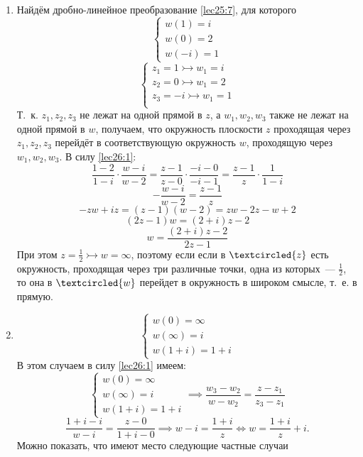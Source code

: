 \documentclass[../../main.tex]{subfiles}
\begin{document}
\begin{examples}
\;

 \begin{enumerate}
  \item
 Найдём дробно-линейное преобразование \eqref{lec25:7}, 
 для которого
 \[
 \begin{cases}
w(1) = i \\ 
w(0) = 2 \\
w(-i) = 1  
 \end{cases}
\]
 \[\begin{cases}
  z_1 = 1 \rightarrowtail w_1 = i \\
  z_2 = 0 \rightarrowtail w_1 = 2 \\
  z_3 = -i \rightarrowtail w_1 = 1 \\
  \end{cases}
 \]
 Т.~к. $z_1, z_2, z_3$ не лежат на одной прямой в \textcircled{$z$}, 
 а $w_1, w_2, w_3$ также не лежат на одной прямой в \textcircled{$w$}, 
 получаем, что окружность плоскости \textcircled{$z$} проходящая через
 $z_1, z_2, z_3$  перейдёт в соответствующую окружность \textcircled{$w$},
 проходящую через $w_1, w_2, w_3$. В силу \eqref{lec26:1}:
 \[
  \frac{1 - 2}{1 - i} \cdot \frac{w - i}{w - 2} = 
  \frac{z - 1}{z - 0} \cdot \frac{-i - 0}{-i - 1} =
  \frac{z - 1}{z} \cdot \frac{1}{1 - i}
 \]
 \[
  -\frac{w - i}{w - 2} = \frac{z - 1}{z}
 \]
 \[
  -zw +iz = (z - 1)(w - 2) = zw - 2z - w + 2
 \]
 \[
  (2z - 1)w = (2 + i)z - 2
 \]
 \[
  w = \frac{(2 + i)z - 2}{2z - 1}
 \]
При этом $z= \frac{1}{2} \rightarrowtail w = \infty$, поэтому если если в $
\textcircled{z}$ есть окружность, проходящая через три различные точки, одна 
из которых~--- $\frac{1}{2}$, то она в $\textcircled{w}$ перейдет в 
окружность в широком смысле, т.~е. в прямую.
\item
\[
 \begin{cases}
  w(0) = \infty\\
  w(\infty) = i\\
  w(1 + i) = 1 + i
 \end{cases}
\]
В этом случаем в силу \eqref{lec26:1} имеем:
\[
  \begin{cases}
  w(0) = \infty\\
  w(\infty) = i\\
  w(1 + i) = 1 + i
 \end{cases}
 \implies \frac{w_3 - w_2}{w - w_2} = \frac{z - z_1}{z_3 - z_1}
\]
\[
 \frac{1 + i - i}{w - i} = \frac{z - 0}{1 + i - 0} \implies
 w - i = \frac{1 + i}{z} \iff w = \frac{1 + i}{z} + i.
\]
Можно показать, что имеют место следующие частные случаи 

\end{enumerate}
\end{examples}
\end{document}
